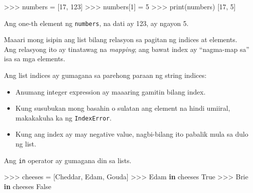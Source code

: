 \documentclass[10pt,]{book}
\newenvironment{Shaded}{}{}
\newcommand{\BuiltInTok}[1]{\textcolor[rgb]{0.00,0.50,0.00}{#1}}
\newcommand{\DecValTok}[1]{\textcolor[rgb]{0.25,0.63,0.44}{#1}}
\newcommand{\KeywordTok}[1]{\textcolor[rgb]{0.00,0.44,0.13}{\textbf{#1}}}
\newcommand{\NormalTok}[1]{#1}
\newcommand{\OperatorTok}[1]{\textcolor[rgb]{0.40,0.40,0.40}{#1}}
\newcommand{\StringTok}[1]{\textcolor[rgb]{0.25,0.44,0.63}{#1}}
\newcommand{\VariableTok}[1]{\textcolor[rgb]{0.10,0.09,0.49}{#1}}
\providecommand{\tightlist}{%
  \setlength{\itemsep}{0pt}\setlength{\parskip}{0pt}}
\begin{document}

\begin{Shaded}
\begin{Highlighting}[]
\OperatorTok{\textgreater{}\textgreater{}\textgreater{}}\NormalTok{ numbers }\OperatorTok{=}\NormalTok{ [}\DecValTok{17}\NormalTok{, }\DecValTok{123}\NormalTok{]}
\OperatorTok{\textgreater{}\textgreater{}\textgreater{}}\NormalTok{ numbers[}\DecValTok{1}\NormalTok{] }\OperatorTok{=} \DecValTok{5}
\OperatorTok{\textgreater{}\textgreater{}\textgreater{}} \BuiltInTok{print}\NormalTok{(numbers)}
\NormalTok{[}\DecValTok{17}\NormalTok{, }\DecValTok{5}\NormalTok{]}
\end{Highlighting}
\end{Shaded}

Ang one-th element ng \texttt{numbers}, na dati ay 123, ay ngayon 5.

 

Maaari mong isipin ang list bilang relasyon sa pagitan ng indices at
elements. Ang relasyong ito ay tinatawag na \emph{mapping}; ang bawat
index ay ``nagma-map sa'' isa sa mga elements.

 

Ang list indices ay gumagana sa parehong paraan ng string indices:

\begin{itemize}
\item
  Anumang integer expression ay maaaring gamitin bilang index.
\item
  Kung susubukan mong basahin o sulatan ang element na hindi umiiral,
  makakakuha ka ng \texttt{IndexError}.
\end{itemize}

 

\begin{itemize}
\tightlist
\item
  Kung ang index ay may negative value, nagbi-bilang ito pabalik mula sa
  dulo ng list.
\end{itemize}

  
 

Ang \texttt{in} operator ay gumagana din sa lists.

\begin{Shaded}
\begin{Highlighting}[]
\OperatorTok{\textgreater{}\textgreater{}\textgreater{}}\NormalTok{ cheeses }\OperatorTok{=}\NormalTok{ [}\StringTok{\textquotesingle{}Cheddar\textquotesingle{}}\NormalTok{, }\StringTok{\textquotesingle{}Edam\textquotesingle{}}\NormalTok{, }\StringTok{\textquotesingle{}Gouda\textquotesingle{}}\NormalTok{]}
\OperatorTok{\textgreater{}\textgreater{}\textgreater{}} \StringTok{\textquotesingle{}Edam\textquotesingle{}} \KeywordTok{in}\NormalTok{ cheeses}
\VariableTok{True}
\OperatorTok{\textgreater{}\textgreater{}\textgreater{}} \StringTok{\textquotesingle{}Brie\textquotesingle{}} \KeywordTok{in}\NormalTok{ cheeses}
\VariableTok{False}
\end{Highlighting}
\end{Shaded}
\end{document}
